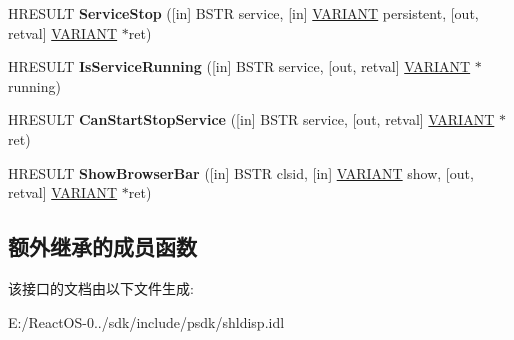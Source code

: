 \begin{DoxyCompactItemize}
\item 
\mbox{\label{interface_shell32_1_1_i_shell_dispatch2_a650d35fb05facc0b35d3e98620069711}} 
H\+R\+E\+S\+U\+LT {\bfseries Service\+Stop} (\mbox{[}in\mbox{]} B\+S\+TR service, \mbox{[}in\mbox{]} \hyperlink{structtag_v_a_r_i_a_n_t}{V\+A\+R\+I\+A\+NT} persistent, \mbox{[}out, retval\mbox{]} \hyperlink{structtag_v_a_r_i_a_n_t}{V\+A\+R\+I\+A\+NT} $\ast$ret)
\item 
\mbox{\label{interface_shell32_1_1_i_shell_dispatch2_a4c485156c3257b9b3225354c49e3bdeb}} 
H\+R\+E\+S\+U\+LT {\bfseries Is\+Service\+Running} (\mbox{[}in\mbox{]} B\+S\+TR service, \mbox{[}out, retval\mbox{]} \hyperlink{structtag_v_a_r_i_a_n_t}{V\+A\+R\+I\+A\+NT} $\ast$running)
\item 
\mbox{\label{interface_shell32_1_1_i_shell_dispatch2_a9d1a8bc66638810b7436293026d1a3bc}} 
H\+R\+E\+S\+U\+LT {\bfseries Can\+Start\+Stop\+Service} (\mbox{[}in\mbox{]} B\+S\+TR service, \mbox{[}out, retval\mbox{]} \hyperlink{structtag_v_a_r_i_a_n_t}{V\+A\+R\+I\+A\+NT} $\ast$ret)
\item 
\mbox{\label{interface_shell32_1_1_i_shell_dispatch2_a7d003d377843310b36c346a9b3697872}} 
H\+R\+E\+S\+U\+LT {\bfseries Show\+Browser\+Bar} (\mbox{[}in\mbox{]} B\+S\+TR clsid, \mbox{[}in\mbox{]} \hyperlink{structtag_v_a_r_i_a_n_t}{V\+A\+R\+I\+A\+NT} show, \mbox{[}out, retval\mbox{]} \hyperlink{structtag_v_a_r_i_a_n_t}{V\+A\+R\+I\+A\+NT} $\ast$ret)
\end{DoxyCompactItemize}
\subsection*{额外继承的成员函数}


该接口的文档由以下文件生成\+:\begin{DoxyCompactItemize}
\item 
E\+:/\+React\+O\+S-\/0../sdk/include/psdk/shldisp.\+idl\end{DoxyCompactItemize}
